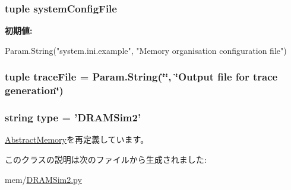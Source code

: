 \label{classDRAMSim2_1_1DRAMSim2_a1aadf525515ecfcf662c2aa51a503763}
\hypertarget{classDRAMSim2_1_1DRAMSim2_a2da83515e23819e805717a80908b8b0f}{
\subsubsection[{systemConfigFile}]{\setlength{\rightskip}{0pt plus 5cm}tuple {\bf systemConfigFile}}}
\label{classDRAMSim2_1_1DRAMSim2_a2da83515e23819e805717a80908b8b0f}
{\bfseries 初期値:}
\begin{DoxyCode}
Param.String("system.ini.example",
                                    "Memory organisation configuration file")
\end{DoxyCode}
\hypertarget{classDRAMSim2_1_1DRAMSim2_a4c880f8f4590f0a754c7122072a21b4e}{
\subsubsection[{traceFile}]{\setlength{\rightskip}{0pt plus 5cm}tuple {\bf traceFile} = Param.String(\char`\"{}\char`\"{}, \char`\"{}Output file for trace generation\char`\"{})}}
\label{classDRAMSim2_1_1DRAMSim2_a4c880f8f4590f0a754c7122072a21b4e}
\hypertarget{classDRAMSim2_1_1DRAMSim2_acce15679d830831b0bbe8ebc2a60b2ca}{
\subsubsection[{type}]{\setlength{\rightskip}{0pt plus 5cm}string {\bf type} = '{\bf DRAMSim2}'}}
\label{classDRAMSim2_1_1DRAMSim2_acce15679d830831b0bbe8ebc2a60b2ca}


\hyperlink{classAbstractMemory_1_1AbstractMemory_acce15679d830831b0bbe8ebc2a60b2ca}{AbstractMemory}を再定義しています。

このクラスの説明は次のファイルから生成されました:\begin{DoxyCompactItemize}
\item 
mem/\hyperlink{DRAMSim2_8py}{DRAMSim2.py}\end{DoxyCompactItemize}
